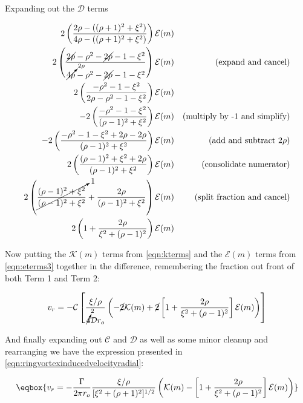 \noindent Expanding out the \(\mathcal{D}\) terms

\begin{equation}
    \label{eqn:eterms3}
    \begin{aligned}
        2\left(\frac{2\rho-((\rho+1)^2+\xi^2)}{4\rho-((\rho+1)^2+\xi^2)} \right)\mathcal{E}(m) \\
        2\left(\frac{\cancel{2\rho}-\rho^2-\cancel{2\rho}-1-\xi^2}{\cancelto{2\rho}{4\rho}-\rho^2 - \cancel{2\rho} -1 -\xi^2} \right)\mathcal{E}(m) && \text{(expand and cancel)} \\
        2\left(\frac{-\rho^2-1-\xi^2}{2\rho-\rho^2 - 1 -\xi^2} \right)\mathcal{E}(m)\\
        -2\left(\frac{-\rho^2-1-\xi^2}{(\rho- 1)^2 +\xi^2} \right)\mathcal{E}(m) && \text{(multiply by -1 and simplify)} \\
        -2\left(\frac{-\rho^2-1-\xi^2 + 2\rho - 2\rho}{(\rho- 1)^2 +\xi^2} \right)\mathcal{E}(m) && \text{(add and subtract }2\rho)\\
        2\left(\frac{(\rho-1)^2+\xi^2 + 2\rho}{(\rho- 1)^2 +\xi^2} \right)\mathcal{E}(m) && \text{(consolidate numerator)}\\
        2\left(\cancelto{1}{\frac{(\rho-1)^2+\xi^2 }{(\rho- 1)^2 +\xi^2}} +\frac{ 2\rho}{(\rho- 1)^2 +\xi^2} \right)\mathcal{E}(m) && \text{(split fraction and cancel)} \\
        2\left(1 + \frac{2\rho}{\xi^2 + (\rho- 1)^2} \right)\mathcal{E}(m) \\
    \end{aligned}
\end{equation}

\noindent Now putting the \(\mathcal{K}(m)\) terms from \cref{eqn:kterms} and the \(\mathcal{E}(m)\) terms from \cref{eqn:eterms3} together in the difference, remembering the fraction out front of both Term 1 and Term 2:

\begin{equation}
    v_r = -\mathcal{C} \left[\frac{\xi/\rho}{\cancelto{2}{4}\mathcal{D}r_o} \left(-\cancel{2}\mathcal{K}(m)+\cancel{2}\left[1+\frac{2\rho}{\xi^2+(\rho-1)^2}\right]\mathcal{E}(m) \right) \right]
\end{equation}

\noindent And finally expanding out \(\mathcal{C}\) and \(\mathcal{D}\) as well as some minor cleanup and rearranging we have the expression presented in \cref{eqn:ringvortexinducedvelocityradial}:

\begin{equation}
    \eqbox{
    v_r = -\frac{\Gamma}{2\pi r_o}\frac{\xi/\rho}{[\xi^2+(\rho+1)^2]^{1/2}} \left(\mathcal{K}(m)-\left[1+\frac{2\rho}{\xi^2+(\rho-1)^2}\right]\mathcal{E}(m) \right)
}
\end{equation}


